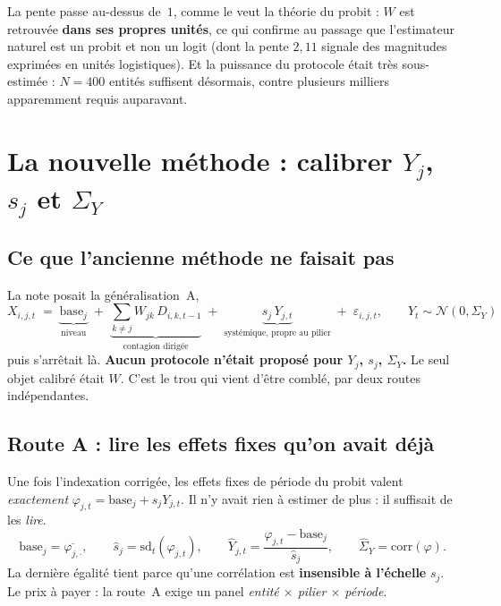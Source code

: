 \documentclass[11pt,a4paper]{article}
\newcommand{\Y}{Y}
\newcommand{\eps}{\varepsilon}
\begin{document}
\noindent
La pente passe au-dessus de~$1$, comme le veut la théorie du probit : $W$ est retrouvée
\textbf{dans ses propres unités}, ce qui confirme au passage que l'estimateur naturel est un
probit et non un logit (dont la pente $2{,}11$ signale des magnitudes exprimées en unités
logistiques). Et la puissance du protocole était très sous-estimée : $N = 400$ entités
suffisent désormais, contre plusieurs milliers apparemment requis auparavant.

\section{La nouvelle méthode : calibrer $\Y_j$, $s_j$ et $\Sigma_Y$}

\subsection{Ce que l'ancienne méthode ne faisait pas}

La note posait la généralisation~A,
\begin{equation}
X_{i,j,t} \;=\; \underbrace{\text{base}_j}_{\text{niveau}}
\;+\; \underbrace{\textstyle\sum_{k \neq j} W_{jk}\, D_{i,k,t-1}}_{\text{contagion dirigée}}
\;+\; \underbrace{s_j\, \Y_{j,t}}_{\text{systémique, propre au pilier}}
\;+\; \eps_{i,j,t}, \qquad \Y_t \sim \mathcal{N}(0, \Sigma_Y)
\end{equation}
puis s'arrêtait là. \textbf{Aucun protocole n'était proposé pour $\Y_j$, $s_j$, $\Sigma_Y$.}
Le seul objet calibré était $W$. C'est le trou qui vient d'être comblé, par deux routes
indépendantes.

\subsection{Route A : lire les effets fixes qu'on avait déjà}

Une fois l'indexation corrigée, les effets fixes de période du probit valent \emph{exactement}
$\varphi_{j,t} = \text{base}_j + s_j \Y_{j,t}$. Il n'y avait rien à estimer de plus : il
suffisait de les \emph{lire}.
\begin{equation}
\text{base}_j = \overline{\varphi_{j,\cdot}}, \qquad
\hat{s}_j = \mathrm{sd}_t(\varphi_{j,t}), \qquad
\hat{\Y}_{j,t} = \frac{\varphi_{j,t} - \text{base}_j}{\hat{s}_j}, \qquad
\hat{\Sigma}_Y = \mathrm{corr}(\varphi) .
\end{equation}
La dernière égalité tient parce qu'une corrélation est \textbf{insensible à l'échelle} $s_j$.
Le prix à payer : la route~A exige un panel \emph{entité $\times$ pilier $\times$ période}.
\end{document}
